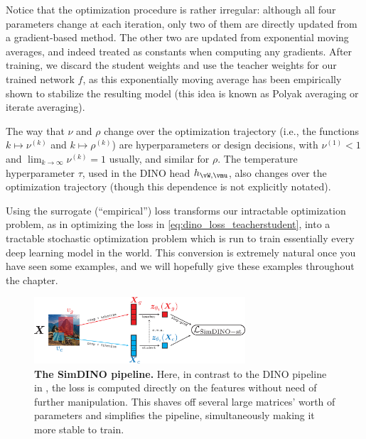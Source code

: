 \documentclass[../../book-main.tex]{subfiles}
\begin{document}
Notice that the optimization procedure is rather irregular: although all four parameters change at each iteration, only two of them are directly updated from a gradient-based method. The other two are updated from exponential moving averages, and indeed treated as constants when computing any gradients. After training, we discard the student weights and use the teacher weights for our trained network \(f\), as this exponentially moving average has been empirically shown to stabilize the resulting model (this idea is known as Polyak averaging or iterate averaging). 

The way that \(\nu\) and \(\rho\) change over the optimization trajectory (i.e., the functions \(k \mapsto \nu^{(k)}\) and \(k \mapsto \rho^{(k)}\)) are hyperparameters or design decisions, with \(\nu^{(1)} < 1\) and \(\lim_{k \to \infty}\nu^{(k)} = 1\) usually, and similar for \(\rho\). The temperature hyperparameter \(\tau\), used in the DINO head \(h_{\vW, \vmu}\), also changes over the optimization trajectory (though this dependence is not explicitly notated).

Using the surrogate (``empirical'') loss transforms our intractable optimization problem, as in optimizing the loss in \eqref{eq:dino_loss_teacherstudent}, into a tractable stochastic optimization problem which is run to train essentially every deep learning model in the world. This conversion is extremely natural once you have seen some examples, and we will hopefully give these examples throughout the chapter. 

\begin{figure}
    \centering 
    \includegraphics[width=0.7\textwidth]{chapters/chapter7/figs/simdino_pipeline.pdf}
    \caption{\small\textbf{The SimDINO pipeline.} Here, in contrast to the DINO pipeline in , the loss is computed directly on the features without need of further manipulation. This shaves off several large matrices' worth of parameters and simplifies the pipeline, simultaneously making it more stable to train.}\label{fig:simdino_pipeline}
\end{figure}
\end{document}
